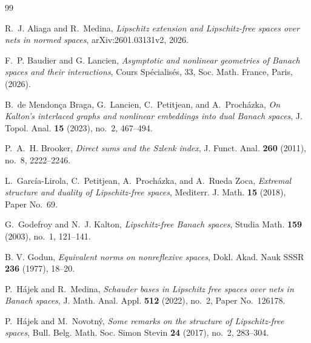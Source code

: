\documentclass[11pt]{amsart}
\theoremstyle{definition}
\begin{document}
\begin{thebibliography}{99}

R.~J. Aliaga and R.~Medina,
{\em Lipschitz extension and Lipschitz-free spaces over nets in normed spaces},
arXiv:2601.03131v2, 2026.




 F.~P. Baudier and G. Lancien, {\it Asymptotic and nonlinear geometries of Banach spaces and their interactions}, Cours Sp\'ecialis\'es, 33, Soc. Math. France, Paris, (2026). 

B.~de Mendon\c{c}a Braga, G.~Lancien, C.~Petitjean, and A.~Proch\'azka,
{\em On Kalton's interlaced graphs and nonlinear embeddings into dual Banach
spaces},
J. Topol. Anal. \textbf{15} (2023), no.~2, 467--494.

 P.~A.~H. Brooker, \emph{Direct sums and the Szlenk index}, J. Funct. Anal. \textbf{260} (2011), no.~8, 2222--2246.



L.~Garc\'ia-Lirola, C.~Petitjean, A.~Proch\'azka, and A.~Rueda Zoca,
{\em Extremal structure and duality of Lipschitz-free spaces},
Mediterr. J. Math. \textbf{15} (2018), Paper No.~69.

G.~Godefroy and N.~J. Kalton,
{\em Lipschitz-free Banach spaces},
Studia Math. \textbf{159} (2003), no.~1, 121--141.

B. V. Godun,
\emph{Equivalent norms on nonreflexive spaces},
Dokl. Akad. Nauk SSSR \textbf{236} (1977), 18--20.

P.~H\'ajek and R.~Medina,
{\em Schauder bases in Lipschitz free spaces over nets in Banach spaces},
J. Math. Anal. Appl. \textbf{512} (2022), no.~2, Paper No.~126178.




P.~H\'ajek and M.~Novotn\'y,
{\em Some remarks on the structure of Lipschitz-free spaces},
Bull. Belg. Math. Soc. Simon Stevin \textbf{24} (2017), no.~2, 283--304.


\end{thebibliography}
\end{document}
